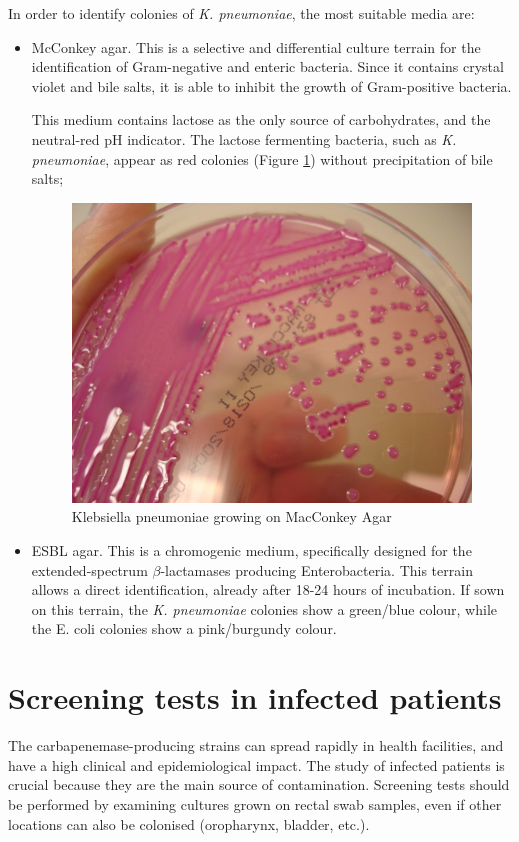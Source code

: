 \documentclass[11pt]{report}
\begin{document}
In order to identify colonies of \emph{K. pneumoniae}, the most suitable media are:
\begin{itemize}
\item McConkey agar.
This is a selective and differential culture terrain for the identification of Gram-negative and enteric bacteria.
Since it contains crystal violet and bile salts, it is able to inhibit the growth of Gram-positive bacteria.

This medium contains lactose as the only source of carbohydrates, and the neutral-red pH indicator.
The lactose fermenting bacteria, such as \emph{K. pneumoniae}, appear as red colonies (Figure \ref{Kleb_MAC}) without precipitation of bile salts;

\begin{figure}[htp]
\centering
\includegraphics[scale=0.250]{img/KlebsiellaMAC.jpg}
\caption{Klebsiella pneumoniae growing on MacConkey Agar \cite{KlebsiellaMAC}}
\label{Kleb_MAC}
\end{figure}

\clearpage
\item ESBL agar.
This is a chromogenic medium, specifically designed for the extended-spectrum $\beta$-lactamases producing Enterobacteria.
This terrain allows a direct identification, already after 18-24 hours of incubation.
If sown on this terrain, the \emph{K. pneumoniae} colonies show a green/blue colour, while the E. coli colonies show a pink/burgundy colour.
\end{itemize}

\section{Screening tests in infected patients}
The carbapenemase-producing strains can spread rapidly in health facilities, and have a high clinical and epidemiological impact.
The study of infected patients is crucial because they are the main source of contamination.
Screening tests should be performed by examining cultures grown on rectal swab samples, even if other locations can also be colonised (oropharynx, bladder, etc.).
\end{document}
